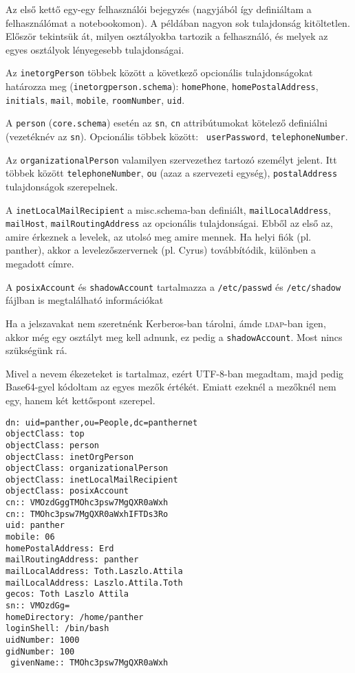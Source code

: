Az első kettő egy-egy felhasználói bejegyzés (nagyjából így definiáltam a felhasználómat a notebookomon).
A példában nagyon sok tulajdonság kitöltetlen. Először tekintsük át, milyen osztályokba tartozik a felhasználó, és
melyek az egyes osztályok lényegesebb tulajdonságai.

Az \texttt{inetorgPerson} többek között a következő opcionális tulajdonságokat határozza meg
(\texttt{inetorgperson.schema}):
\texttt{homePhone}, \texttt{homePostalAddress}, \texttt{initials}, \texttt{mail},  \texttt{mobile},
\texttt{roomNumber}, \texttt{uid}.

A \texttt{person} (\texttt{core.schema}) esetén az \texttt{sn}, \texttt{cn} attribútumokat kötelező definiálni
(vezetéknév az \texttt{sn}). Opcionális többek között: \texttt{ userPassword}, \texttt{telephoneNumber}.

Az \texttt{organizationalPerson} valamilyen szervezethez tartozó személyt jelent. Itt többek között
\texttt{telephoneNumber}, \texttt{ou} (azaz a szervezeti egység), \texttt{postalAddress} tulajdonságok szerepelnek.

A \texttt{inetLocalMailRecipient} a misc.schema-ban definiált, \texttt{mailLocalAddress}, \texttt{mailHost},
\texttt{mailRoutingAddress} az opcionális tulajdonságai. Ebből az első az, amire érkeznek a levelek, az utolsó meg
amire mennek. Ha helyi fiók (pl. panther), akkor a levelezőszervernek (pl. Cyrus) továbbítódik, különben a megadott
címre.

A \texttt{posixAccount} és \texttt{shadowAccount} tartalmazza a \texttt{/etc/passwd} és \texttt{/etc/shadow} fájlban
is megtalálható információkat

Ha a jelszavakat nem szeretnénk Kerberos-ban tárolni, ámde \textsc{ldap}-ban igen, akkor még egy osztályt meg kell adnunk, ez
pedig a \texttt{shadowAccount}. Most nincs szükségünk rá.

Mivel a nevem ékezeteket is tartalmaz, ezért UTF-8-ban megadtam, majd pedig Base64-gyel kódoltam az egyes mezők
értékét. Emiatt ezeknél a mezőknél nem egy, hanem két kettőspont szerepel.

\begin{Verbatim}[frame=single]
dn: uid=panther,ou=People,dc=panthernet
objectClass: top
objectClass: person
objectClass: inetOrgPerson
objectClass: organizationalPerson
objectClass: inetLocalMailRecipient
objectClass: posixAccount
cn:: VMOzdGggTMOhc3psw7MgQXR0aWxh
cn:: TMOhc3psw7MgQXR0aWxhIFTDs3Ro
uid: panther
mobile: 06
homePostalAddress: Erd
mailRoutingAddress: panther
mailLocalAddress: Toth.Laszlo.Attila
mailLocalAddress: Laszlo.Attila.Toth
gecos: Toth Laszlo Attila
sn:: VMOzdGg=
homeDirectory: /home/panther
loginShell: /bin/bash
uidNumber: 1000
gidNumber: 100
 givenName:: TMOhc3psw7MgQXR0aWxh
\end{Verbatim}

